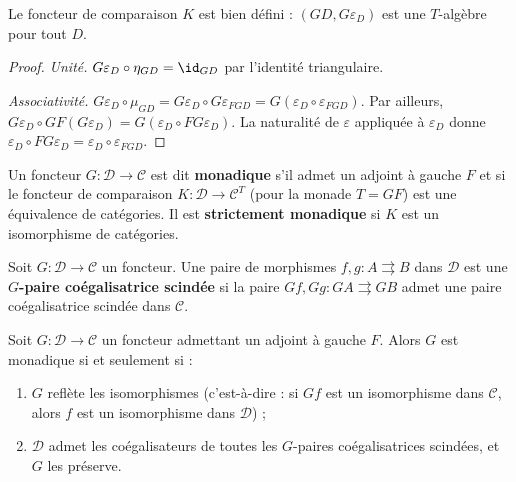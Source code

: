 \begin{proposition}\label{prop:comparaison-bien-defini}
Le foncteur de comparaison $K$ est bien défini :
$(GD, G\varepsilon_D)$ est une $T$-algèbre pour tout $D$.
\end{proposition}

\begin{proof}
\emph{Unité.}
$G\varepsilon_D \circ \eta_{GD} = \id_{GD}$ par l'identité triangulaire.

\emph{Associativité.}
$G\varepsilon_D \circ \mu_{GD} = G\varepsilon_D \circ G\varepsilon_{FGD}
= G(\varepsilon_D \circ \varepsilon_{FGD})$.
Par ailleurs, $G\varepsilon_D \circ GF(G\varepsilon_D)
= G(\varepsilon_D \circ FG\varepsilon_D)$.
La naturalité de $\varepsilon$ appliquée à $\varepsilon_D$ donne
$\varepsilon_D \circ FG\varepsilon_D = \varepsilon_D \circ \varepsilon_{FGD}$.
\end{proof}

\begin{definition}\label{def:foncteur-monadique}
Un foncteur $G \colon \mathcal{D} \to \mathcal{C}$ est dit
\textbf{monadique} s'il admet un adjoint à gauche $F$ et si le
foncteur de comparaison $K \colon \mathcal{D} \to \mathcal{C}^T$
(pour la monade $T = GF$) est une équivalence de catégories.
Il est \textbf{strictement monadique} si $K$ est un isomorphisme
de catégories.
\end{definition}

\begin{definition}\label{def:G-paire-coeg}
Soit $G \colon \mathcal{D} \to \mathcal{C}$ un foncteur.
Une paire de morphismes $f, g \colon A \rightrightarrows B$ dans $\mathcal{D}$
est une \textbf{$G$-paire coégalisatrice scindée} si la paire
$Gf, Gg \colon GA \rightrightarrows GB$ admet une paire coégalisatrice
scindée dans $\mathcal{C}$.
\end{definition}

\begin{theoreme}\label{thm:beck}
Soit $G \colon \mathcal{D} \to \mathcal{C}$ un foncteur admettant
un adjoint à gauche $F$. Alors $G$ est monadique si et seulement si :
\begin{enumerate}[label=(\roman*)]
\item $G$ reflète les isomorphismes
    (c'est-à-dire : si $Gf$ est un isomorphisme dans $\mathcal{C}$,
    alors $f$ est un isomorphisme dans $\mathcal{D}$) ;
\item $\mathcal{D}$ admet les coégalisateurs de toutes les
    $G$-paires coégalisatrices scindées, et $G$ les préserve.
\end{enumerate}
\end{theoreme}

